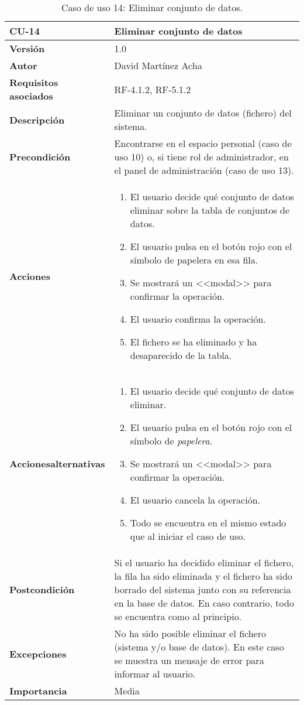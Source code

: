 \begin{table}[p]
	\centering
	\begin{tabularx}{\linewidth}{ p{} p{} }
		\toprule
		\textbf{CU-14}    & \textbf{Eliminar conjunto de datos}\\
		\toprule
		\textbf{Versión}              & 1.0    \\
		\textbf{Autor}                & David Martínez Acha \\
		\textbf{Requisitos asociados} & RF-4.1.2, RF-5.1.2 \\
		\textbf{Descripción}          & Eliminar un conjunto de datos (fichero) del sistema. \\
		\textbf{Precondición}         & Encontrarse en el espacio personal (caso de uso 10) o, si tiene rol de administrador, en el panel de administración (caso de uso 13). \\
		\textbf{Acciones}             &
		\begin{enumerate}
			\def\labelenumi{\arabic{enumi}.}
			\tightlist
			\item El usuario decide qué conjunto de datos eliminar sobre la tabla de conjuntos de datos.
			\item El usuario pulsa en el botón rojo con el símbolo de papelera en esa fila.
			\item Se mostrará un <<modal>> para confirmar la operación.
			\item El usuario confirma la operación.
			\item El fichero se ha eliminado y ha desaparecido de la tabla.
		\end{enumerate}\\
		\textbf{Acciones\newline alternativas}&
		\begin{enumerate}
			\def\labelenumi{\arabic{enumi}.}
			\tightlist
			\item El usuario decide qué conjunto de datos eliminar.
			\item El usuario pulsa en el botón rojo con el símbolo de \textit{papelera}.
			\item Se mostrará un <<modal>> para confirmar la operación.
			\item El usuario cancela la operación.
			\item Todo se encuentra en el mismo estado que al iniciar el caso de uso.
		\end{enumerate}\\
		\textbf{Postcondición}        & Si el usuario ha decidido eliminar el fichero, la fila ha sido eliminada y el fichero ha sido borrado del sistema junto con su referencia en la base de datos. 
		En caso contrario, todo se encuentra como al principio.\\
		\textbf{Excepciones}          & No ha sido posible eliminar el fichero (sistema y/o base de datos). En este caso se muestra un mensaje de error para informar al usuario. \\
		\textbf{Importancia}          & Media \\
		\bottomrule
	\end{tabularx}
	\caption{Caso de uso 14: Eliminar conjunto de datos.}
\end{table}


